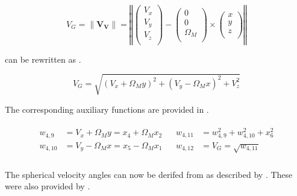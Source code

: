 \begin{equation} \label{eq:VG}
V_{G} = \| \mathbf{V_{V}} \| = 
\left\Vert
\begin{pmatrix}
V_{x}\\
V_{y}\\
V_{z}\\
\end{pmatrix}
-
\begin{pmatrix}
0 \\
0 \\
\Omega_{M} \\
\end{pmatrix}
\times
\begin{pmatrix}
x \\
y \\
z \\
\end{pmatrix}
\right\Vert 
\end{equation}

\noindent
{} can be rewritten as .

\begin{equation}\label{eq:xfifteen}
V_{G} = \sqrt{\left(V_{x}+\Omega_{M}y\right)^{2}+\left(V_{y}-\Omega_{M}x\right)^{2}+V_{z}^{2}} 
\end{equation}

\noindent
The corresponding auxiliary functions are provided in .

\begin{align} \label{eq:velocityAuxF}
\begin{split}
w_{4,9} &= V_{x}+\Omega_{M}y = x_{4}+\Omega_{M}x_{2} \\
w_{4,10} &= V_{y}-\Omega_{M}x = x_{5}-\Omega_{M}x_{1} \\
\end{split}
&
\begin{split}
w_{4,11} &= w_{4,9}^{2}+w_{4,10}^{2}+x_{6}^{2} \\
w_{4,12} &= V_{G}=\sqrt{w_{4,11}} \\
\end{split} 
\end{align} 

 
\noindent 
The spherical velocity angles can now be derifed from  as described by . These were also provided by \cite{mooij1994motion}. 





